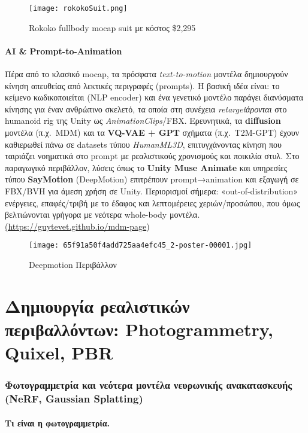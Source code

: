 \begin{figure}[H]
    \centering
    \texttt{[image: rokokoSuit.png]}
    \caption{Rokoko fullbody mocap suit με κόστος \$2,295 }
    \label{fig:placeholder}
\end{figure}

\paragraph{AI \& Prompt-to-Animation}
Πέρα από το κλασικό mocap, τα πρόσφατα \textit{text-to-motion} μοντέλα δημιουργούν κίνηση απευθείας από λεκτικές περιγραφές (prompts). Η βασική ιδέα είναι: το κείμενο κωδικοποιείται (NLP encoder) και ένα γενετικό μοντέλο παράγει διανύσματα κίνησης για έναν ανθρώπινο σκελετό, τα οποία στη συνέχεια \emph{retargetάρονται} στο humanoid rig της Unity ως \textit{AnimationClips}/FBX. Ερευνητικά, τα \textbf{diffusion} μοντέλα (π.χ.\ MDM) και τα \textbf{VQ-VAE + GPT} σχήματα (π.χ.\ T2M-GPT) έχουν καθιερωθεί πάνω σε datasets τύπου \textit{HumanML3D}, επιτυγχάνοντας κίνηση που ταιριάζει νοηματικά στο prompt με ρεαλιστικούς χρονισμούς και ποικιλία στυλ. Στο παραγωγικό περιβάλλον, λύσεις όπως το \textbf{Unity Muse Animate} και υπηρεσίες τύπου \textbf{SayMotion} (DeepMotion) επιτρέπουν prompt→animation και εξαγωγή σε FBX/BVH για άμεση χρήση σε Unity. Περιορισμοί σήμερα: «out-of-distribution» ενέργειες, επαφές/τριβή με το έδαφος και λεπτομέρειες χεριών/προσώπου, που όμως βελτιώνονται γρήγορα με νεότερα whole-body μοντέλα. \href{https://guytevet.github.io/mdm-page}{(https://guytevet.github.io/mdm-page})

\begin{figure}[H]
    \centering
    \texttt{[image: 65f91a50f4add725aa4efc45\_2-poster-00001.jpg]}
    \caption{Deepmotion Περιβάλλον}
    \label{fig:placeholder}
\end{figure}

\section{Δημιουργία ρεαλιστικών περιβαλλόντων: Photogrammetry, Quixel, PBR}

\subsubsection{Φωτογραμμετρία και νεότερα μοντέλα νευρωνικής ανακατασκευής (NeRF, Gaussian Splatting)}
\paragraph{Τι είναι η φωτογραμμετρία.}

